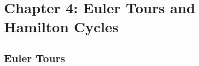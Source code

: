 \documentclass{article}
\begin{document}
\section*{Chapter 4: Euler Tours and Hamilton Cycles}
\subsection{Euler Tours}
\end{document}
